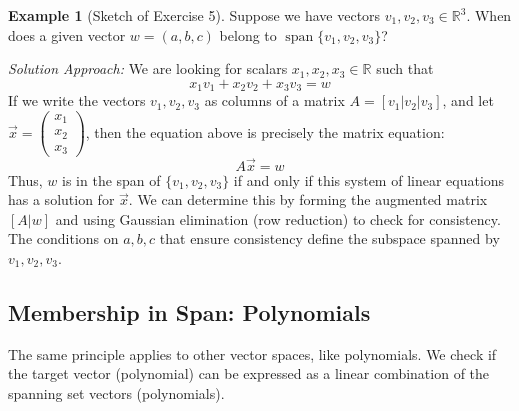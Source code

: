 \documentclass[11pt]{article}
\theoremstyle{definition}
\newtheorem{example}[theorem]{Example}
\theoremstyle{remark}
\begin{document}
\begin{example}[Sketch of Exercise 5]
Suppose we have vectors $v_1, v_2, v_3 \in \mathbb{R}^3$. When does a given vector $w = (a, b, c)$ belong to $\operatorname{span}\{v_1, v_2, v_3\}$?

\emph{Solution Approach:}
We are looking for scalars $x_1, x_2, x_3 \in \mathbb{R}$ such that
\[ x_1 v_1 + x_2 v_2 + x_3 v_3 = w \]
If we write the vectors $v_1, v_2, v_3$ as columns of a matrix $A = [v_1 | v_2 | v_3]$, and let $\vec{x} = \begin{pmatrix} x_1 \\ x_2 \\ x_3 \end{pmatrix}$, then the equation above is precisely the matrix equation:
\[ A \vec{x} = w \]
Thus, $w$ is in the span of $\{v_1, v_2, v_3\}$ if and only if this system of linear equations has a solution for $\vec{x}$. We can determine this by forming the augmented matrix $[A | w]$ and using Gaussian elimination (row reduction) to check for consistency. The conditions on $a, b, c$ that ensure consistency define the subspace spanned by $v_1, v_2, v_3$.
\end{example}

\subsection{Membership in Span: Polynomials}

The same principle applies to other vector spaces, like polynomials. We check if the target vector (polynomial) can be expressed as a linear combination of the spanning set vectors (polynomials).
\end{document}
